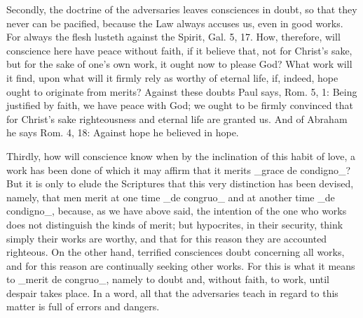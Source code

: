 Secondly, the doctrine of the adversaries leaves consciences in doubt,
so that they never can be pacified, because the Law always accuses
us, even in good works.  For always the flesh lusteth against the
Spirit, Gal. 5, 17. How, therefore, will conscience here have peace
without faith, if it believe that, not for Christ's sake, but for the
sake of one's own work, it ought now to please God?  What work will
it find, upon what will it firmly rely as worthy of eternal life, if,
indeed, hope ought to originate from merits?  Against these doubts
Paul says, Rom. 5, 1: Being justified by faith, we have peace with
God; we ought to be firmly convinced that for Christ's sake
righteousness and eternal life are granted us.  And of Abraham he
says Rom. 4, 18: Against hope he believed in hope.

Thirdly, how will conscience know when by the inclination of this
habit of love, a work has been done of which it may affirm that it
merits _grace de condigno_?  But it is only to elude the Scriptures
that this very distinction has been devised, namely, that men merit
at one time _de congruo_ and at another time _de condigno_, because,
as we have above said, the intention of the one who works does not
distinguish the kinds of merit; but hypocrites, in their security,
think simply their works are worthy, and that for this reason they
are accounted righteous.  On the other hand, terrified consciences
doubt concerning all works, and for this reason are continually
seeking other works.  For this is what it means to _merit de congruo_,
namely to doubt and, without faith, to work, until despair takes
place.  In a word, all that the adversaries teach in regard to this
matter is full of errors and dangers.

